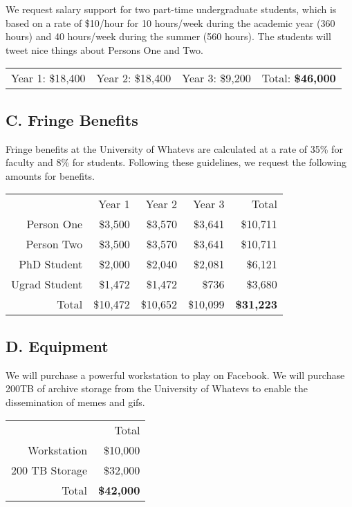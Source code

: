  We request salary support for two part-time undergraduate students, which is based on a rate of \$10/hour for 10 hours/week during the academic year (360 hours) and 40 hours/week during the summer (560 hours). The students will tweet nice things about Persons One and Two.
\newline
\begin{table}[H]
\begin{tabular}[c]{cccc}
Year 1: \$18,400 & Year 2: \$18,400 & Year 3: \$9,200 & Total: \textbf{\$46,000}
\end{tabular}
\end{table}

\subsection*{C. Fringe Benefits}
Fringe benefits at the University of Whatevs are calculated at a rate of 35\% for faculty and 8\% for students. Following these guidelines, we request the following amounts for benefits.
\newline
\begin{table}[H]
\begin{tabular}[c]{r r r r | r}
                & Year 1     & Year 2     & Year 3     & Total\\
 Person One     & \$3,500    & \$3,570    & \$3,641    & \$10,711\\
 Person Two     & \$3,500    & \$3,570    & \$3,641    & \$10,711\\
 PhD Student    & \$2,000    & \$2,040    & \$2,081    & \$6,121\\
 Ugrad Student  & \$1,472    & \$1,472    & \$736      & \$3,680\\
 \hline
 Total          & \$10,472   & \$10,652   & \$10,099   & \textbf{\$31,223} \\
\end{tabular}
\end{table}

\subsection*{D. Equipment}
We will purchase a powerful workstation to play on Facebook. We will purchase 200TB of archive storage from the University of Whatevs to enable the dissemination of memes and gifs.
\newline
\begin{table}[H]
\begin{tabular}[c]{r | r}
 & Total\\
Workstation     & \$10,000\\
200 TB Storage  & \$32,000\\
\hline
Total           & \textbf{\$42,000}
\end{tabular}
\end{table}

